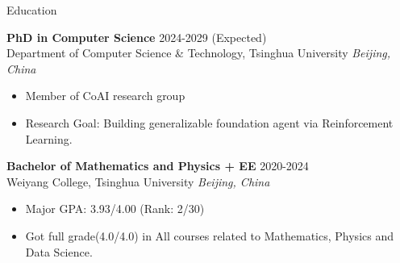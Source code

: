 \documentclass{resume} %
\begin{document}




\begin{rSection}{Education}

{\bf PhD in Computer Science} \hfill {2024-2029 (Expected)} \\
Department of Computer Science \& Technology, Tsinghua University \hfill \textit{Beijing, China}
\begin{itemize}
    \item Member of CoAI research group
    \item Research Goal: Building generalizable foundation agent via Reinforcement Learning. 
\end{itemize}

{\bf Bachelor of Mathematics and Physics + EE} \hfill {2020-2024}\\
Weiyang College, Tsinghua University \hfill \textit{Beijing, China}
\begin{itemize}
    \item Major GPA: 3.93/4.00 (Rank: 2/30)
    \item Got full grade(4.0/4.0) in All courses related to Mathematics, Physics and Data Science.
\end{itemize}


\end{rSection}
\end{document}
